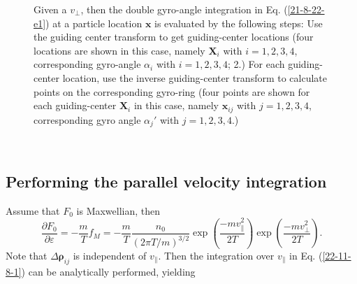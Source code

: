 \documentclass{article}
\begin{document}
\begin{figure}[h]
  \caption{\label{21-8-22-a1}Given a $v_{\perp}$, then the double gyro-angle
  integration in Eq. (\ref{21-8-22-e1}) at a particle location $\mathbf{x}$ is
  evaluated by the following steps: Use the guiding center transform to get
  guiding-center locations (four locations are shown in this case, namely
  $\mathbf{X}_i$ with $i = 1, 2, 3, 4$, corresponding gyro-angle $\alpha_i$
  with $i = 1, 2, 3, 4$; 2.) For each guiding-center location, use the inverse
  guiding-center transform to calculate points on the corresponding gyro-ring
  (four points are shown for each guiding-center $\mathbf{X}_i$ in this case,
  namely $\mathbf{x}_{i j}$ with $j = 1, 2, 3, 4$, corresponding gyro angle
  $\alpha_j'$ with $j = 1, 2, 3, 4$.)}
\end{figure}

\

\subsection{Performing the parallel velocity integration}

Assume that $F_0$ is Maxwellian, then
\begin{equation}
  \frac{\partial F_0}{\partial \varepsilon} = - \frac{m}{T} f_M = -
  \frac{m}{T} \frac{n_0}{(2 \pi T / m)^{3 / 2}} \exp \left( \frac{- m
  v^2_{\parallel}}{2 T} \right) \exp \left( \frac{- m v^2_{\perp}}{2 T}
  \right) .
\end{equation}
Note that $\Delta \mathbf{\rho}_{i j}$ is independent of $v_{\parallel}$. Then
the integration over $v_{\parallel}$ in Eq. (\ref{22-11-8-1}) can be
analytically performed, yielding
\end{document}
